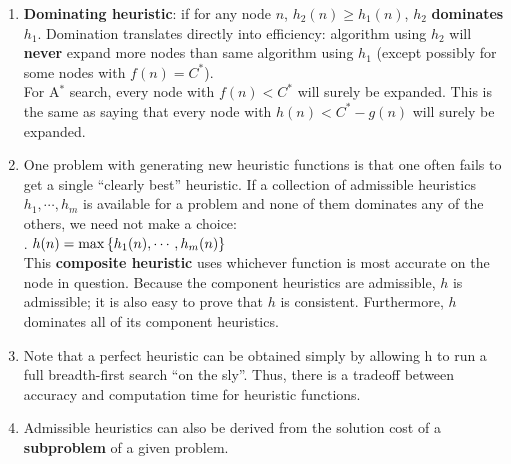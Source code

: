 \begin{enumerate}
\begin{enumerate}
        \item \textbf{Dominating heuristic}: if for any node $n$, $h_2(n) \geq h_1(n)$, $h_2$ \textbf{dominates} $h_1$.
        Domination translates directly into efficiency: algorithm using $h_2$ will \textbf{never} expand more nodes than same algorithm using $h_1$ 
        (except possibly for some nodes with $f(n) = C^\ast$).
        \hfill \cite{ai/book/Artificial-Intelligence-A-Modern-Approach/Russell-Norvig}
        \\
        For A$^\ast$ search, every node with $f(n) < C^\ast$ will surely be expanded.
        This is the same as saying that every node with $h(n) < C^\ast - g(n)$ will surely be expanded.
        \hfill \cite{ai/book/Artificial-Intelligence-A-Modern-Approach/Russell-Norvig}

        \item One problem with generating new heuristic functions is that one often fails to get a single “clearly best” heuristic. 
        If a collection of admissible heuristics $h_1, \cdots, h_m$ is available for a problem and none of them dominates any of the others, we need not make a choice:
        \hfill \cite{ai/book/Artificial-Intelligence-A-Modern-Approach/Russell-Norvig}
        \\
        .\hfill
        $h(n) = \max\left\{h_1(n),\cdots,h_m(n)\right\}$
        \hfill \cite{ai/book/Artificial-Intelligence-A-Modern-Approach/Russell-Norvig}
        \\
        This \textbf{composite heuristic} uses whichever function is most accurate on the node in question.
        Because the component heuristics are admissible, $h$ is admissible; it is also easy to prove that $h$ is consistent. 
        Furthermore, $h$ dominates all of its component heuristics.
        \hfill \cite{ai/book/Artificial-Intelligence-A-Modern-Approach/Russell-Norvig}

        \item Note that a perfect heuristic can be obtained simply by allowing h to run a full breadth-first search “on the sly”. 
        Thus, there is a tradeoff between accuracy and computation time for heuristic functions.
        \hfill \cite{ai/book/Artificial-Intelligence-A-Modern-Approach/Russell-Norvig}

        \item Admissible heuristics can also be derived from the solution cost of a \textbf{subproblem} of a given problem.
        \hfill \cite{ai/book/Artificial-Intelligence-A-Modern-Approach/Russell-Norvig}


\end{enumerate}
\end{enumerate}
